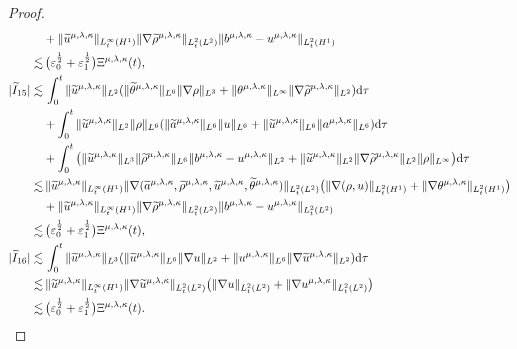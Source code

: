 \documentclass[reqno,11pt]{amsart}
\theoremstyle{plain}
\numberwithin{equation}{section}
\newcommand{\eps}{{\varepsilon}}
\begin{document}
\begin{proof}
\begin{align}
&+\|\widetilde{u}^{{\mu,\lambda,\kappa}}\|_{L_t^{\infty}(H^1)}\|\nabla\widetilde{\rho}^{{\mu,\lambda,\kappa}}\|_{L_t^{2}(L^2)} \|b^{\mu,\lambda,\kappa}-u^{\mu,\lambda,\kappa}\|_{L_t^2(H^1)}  \nonumber\\
\lesssim&\, \big(\eps_0^\frac{1}{2}+\eps_1^\frac{1}{2}\big){\Xi} ^{\mu,\lambda,\kappa}(t),\label{G4.13-2}\\
|\widetilde{I}_{15}|\lesssim&\, \int_0^t \|{\widetilde{u}^{\mu,\lambda,\kappa}}\|_{L^2}(\|\widetilde\theta^{\mu,\lambda,\kappa}\|_{L^6}\|\nabla\rho\|_{L^3}+\|\theta^{\mu,\lambda,\kappa}\|_{L^\infty}\|\nabla\widetilde{\rho}^{\mu,\lambda,\kappa}\|_{L^2}) {\rm d}\tau\nonumber\\
&+\int_{0}^t \|\widetilde{u}^{\mu,\lambda,\kappa}\|_{L^2}\|\rho\|_{L^6}(\|\widetilde{a}^{\mu,\lambda,\kappa}\|_{L^6}\|u\|_{L^6}+\|\widetilde{u}^{\mu,\lambda,\kappa}\|_{L^6}\|a^{\mu,\lambda,\kappa}\|_{L^6}) {\rm d}\tau \nonumber\\
&+\int_0^t \big(\|\widetilde{u}^{\mu,\lambda,\kappa}\|_{L^3}\|\widetilde{\rho}^{\mu,\lambda,\kappa}\|_{L^6}\|b^{\mu,\lambda,\kappa}-u^{\mu,\lambda,\kappa}\|_{L^2}+\|{\widetilde{u}^{\mu,\lambda,\kappa}}\|_{L^2}\|\nabla\widetilde{\rho}^{\mu,\lambda,\kappa}\|_{L^2}\|\rho \|_{L^\infty}\big){\rm d}\tau\nonumber\\
\lesssim&\, \|\widetilde{u}^{\mu,\lambda,\kappa}\|_{L_t^\infty(H^1)}\|\nabla(\widetilde{a}^{\mu,\lambda,\kappa},\widetilde{\rho}^{\mu,\lambda,\kappa},\widetilde{u}^{\mu,\lambda,\kappa},\widetilde{\theta}^{\mu,\lambda,\kappa})\|_{L_t^2(L^2)}\big(\|\nabla(\rho,u)\|_{L_t^2(H^1)}+\|\nabla \theta^{\mu,\lambda,\kappa} \|_{L_t^2(H^1)}\big)\nonumber\\
&+\|\widetilde{u}^{\mu,\lambda,\kappa}\|_{L_t^\infty(H^1)}\|\nabla \widetilde{\rho}^{\mu,\lambda,\kappa} \|_{L_t^2(L^2)}\|b^{\mu,\lambda,\kappa}-u^{\mu,\lambda,\kappa}\|_{L_t^2(L^2)}\nonumber\\
\lesssim&\, \big(\eps_0^\frac{1}{2}+\eps_1^\frac{1}{2}\big){\Xi} ^{\mu,\lambda,\kappa}(t), \label{G4.13-3}\\
|\widetilde{I}_{16}|\lesssim&\, \int_0^t\|\widetilde{u}^{\mu,\lambda,\kappa}\|_{L^3}(\|\widetilde{u}^{\mu,\lambda,\kappa}\|_{L^6}\|\nabla u\|_{L^2}+\| {u}^{\mu,\lambda,\kappa}\|_{L^6}\|\nabla \widetilde{u}^{\mu,\lambda,\kappa}\|_{L^2}){\rm d}\tau\nonumber\\
\lesssim&\, \|\widetilde{u}^{\mu,\lambda,\kappa}\|_{L_t^\infty(H^1)} \|\nabla\widetilde{u}^{\mu,\lambda,\kappa}\|_{L_t^2(L^2)}\big( \|\nabla u\|_{L_t^2(L^2)}+\|\nabla u^{\mu,\lambda,\kappa}\|_{L_t^2(L^2)}\big)\nonumber\\
\lesssim&\, \big(\eps_0^\frac{1}{2}+\eps_1^\frac{1}{2}\big){\Xi} ^{\mu,\lambda,\kappa}(t).\label{G4.13}
\end{align}
 

\end{proof}
\end{document}

